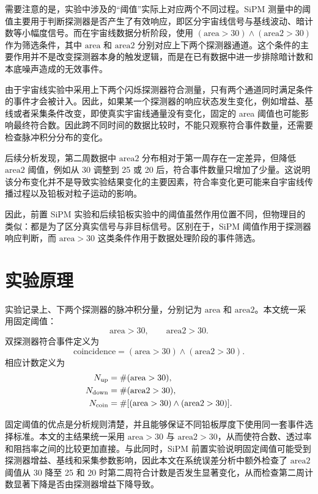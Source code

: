 \documentclass[aps,prl,twocolumn,superscriptaddress,nofootinbib]{revtex4-2}
\begin{document}
需要注意的是，实验中涉及的“阈值”实际上对应两个不同过程。SiPM 测量中的阈值主要用于判断探测器是否产生了有效响应，即区分宇宙线信号与基线波动、暗计数等小幅度信号。而在宇宙线数据分析阶段，使用 \((\mathrm{area}>30)\land(\mathrm{area2}>30)\) 作为筛选条件，其中 \(\mathrm{area}\) 和 \(\mathrm{area2}\) 分别对应上下两个探测器通道。这个条件的主要作用并不是改变探测器本身的触发逻辑，而是在已有数据中进一步排除暗计数和本底噪声造成的无效事件。

由于宇宙线实验中采用上下两个闪烁探测器符合测量，只有两个通道同时满足条件的事件才会被计入。因此，如果某一个探测器的响应状态发生变化，例如增益、基线或者采集条件改变，即使真实宇宙线通量没有变化，固定的 area 阈值也可能影响最终符合数。因此跨不同时间的数据比较时，不能只观察符合事件数量，还需要检查脉冲积分分布的变化。

后续分析发现，第二周数据中 \(\mathrm{area2}\) 分布相对于第一周存在一定差异，但降低 \(\mathrm{area2}\) 阈值，例如从 30 调整到 25 或 20 后，符合事件数量只增加了少量。这说明该分布变化并不是导致实验结果变化的主要因素，符合率变化更可能来自宇宙线传播过程以及铅板对粒子运动的影响。

因此，前置 SiPM 实验和后续铅板实验中的阈值虽然作用位置不同，但物理目的类似：都是为了区分真实信号与非目标信号。区别在于，SiPM 阈值作用于探测器响应判断，而 \(\mathrm{area}>30\) 这类条件作用于数据处理阶段的事件筛选。


\section{实验原理}

实验记录上、下两个探测器的脉冲积分量，分别记为 $\mathrm{area}$ 和 $\mathrm{area2}$。本文统一采用固定阈值：
\begin{equation}
\mathrm{area}>30,\qquad \mathrm{area2}>30 .
\end{equation}
双探测器符合事件定义为
\begin{equation}
\mathrm{coincidence}=(\mathrm{area}>30)\land(\mathrm{area2}>30).
\end{equation}
相应计数定义为
\begin{align}
N_{\rm up} &= \#(\mathrm{area}>30),\\
N_{\rm down} &= \#(\mathrm{area2}>30),\\
N_{\rm coin} &= \#[(\mathrm{area}>30)\land(\mathrm{area2}>30)].
\end{align}

固定阈值的优点是分析规则清楚，并且能够保证不同铅板厚度下使用同一套事件选择标准。本文的主结果统一采用 \(\mathrm{area}>30\) 与 \(\mathrm{area2}>30\)，从而使符合数、透过率和阻挡率之间的比较更加直接。与此同时，SiPM 前置实验说明固定阈值可能受到探测器增益、基线和采集参数影响，因此本文在系统误差分析中额外检查了 \(\mathrm{area2}\) 阈值从 30 降至 25 和 20 时第二周符合计数是否发生显著变化，从而检查第二周计数显著下降是否由探测器增益下降导致。
\end{document}
